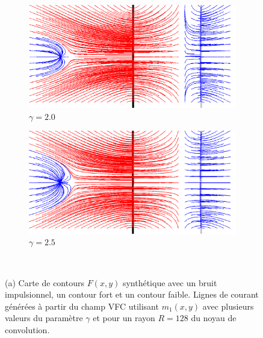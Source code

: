 \begin{figure}[!h]
   \begin{subfigure}[c]{.5\linewidth}
     \centering
     \includegraphics[scale=0.35]{Chapters/Images/m1_gamma_20.png}
     \caption{$\gamma=2.0$}
   \end{subfigure}
   \begin{subfigure}[c]{.5\linewidth}
     \centering
     \includegraphics[scale=0.35]{Chapters/Images/m1_gamma_25.png}
     \caption{$\gamma=2.5$}
   \end{subfigure}\\
   
   \caption{(a) Carte de contours $F(x,y)$ synthétique avec un bruit impulsionnel, un contour fort et un contour faible. Lignes de courant générées à partir du champ VFC utilisant $m_1(x,y)$ avec plusieurs valeurs du paramètre $\gamma$ et pour un rayon $R=128$ du noyau de convolution.}
   \label{fig:gamma}
\end{figure}
